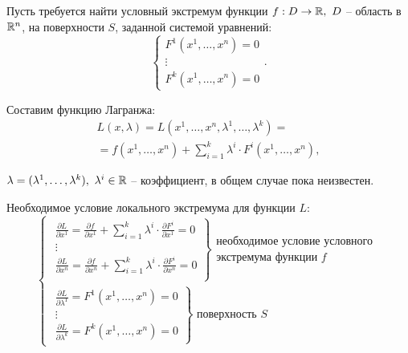 \begin{task}
    Пусть требуется найти условный экстремум функции $f:D\rightarrow\mathbb{R}, \ D$ -- область в $\mathbb{R}^n$, на поверхности $S$, заданной системой уравнений:
    \[
        \left\{\begin{array}{l}
            F^1(x^1,\ldots,x^n) = 0 \\
            \vdots                  \\
            F^k(x^1,\ldots,x^n) = 0
        \end{array}\right..
    \]

    Составим функцию Лагранжа:
    \begin{multline*}
        L(x,\lambda) = L(x^1,\ldots,x^n,\lambda^1,\ldots,\lambda^k) = \\
        = f(x^1,\ldots,x^n) + \sum_{i=1}^{k}\lambda^i\cdot F^i(x^1,\ldots,x^n),
    \end{multline*}

    $\lambda = (\lambda^1,\ldots,\lambda^k), \ \lambda^i \in \R$ -- коэффициент, в общем случае пока неизвестен.

    Необходимое условие локального экстремума для функции $L:$
    \begin{equation}\label{eq:24}
        \left\{\begin{array}{l}
            \left.\begin{array}{l}
                      \frac{\partial L}{\partial x^1} = \frac{\partial f}{\partial x^1} + \sum_{i = 1}^{k}\lambda^i\cdot\frac{\partial F^i}{\partial x^1} = 0 \\
                      \vdots                                                                                                                      \\
                      \frac{\partial L}{\partial x^n} = \frac{\partial f}{\partial x^n} + \sum_{i = 1}^{k}\lambda^i\cdot\frac{\partial F^i}{\partial x^n} = 0 \\
                  \end{array}\right\}\begin{array}{l}
                                         \text{необходимое условие условного} \\
                                         \text{экстремума функции }f
                                     \end{array} \\
            \left.\begin{array}{l}
                      \frac{\partial L}{\partial \lambda^1} = F^1(x^1,\ldots,x^n) = 0 \\
                      \vdots                                                      \\
                      \frac{\partial L}{\partial \lambda^k} = F^k(x^1,\ldots,x^n) = 0
                  \end{array}\right\}\text{ поверхность }S
        \end{array}\right.
    \end{equation}
\end{task}

